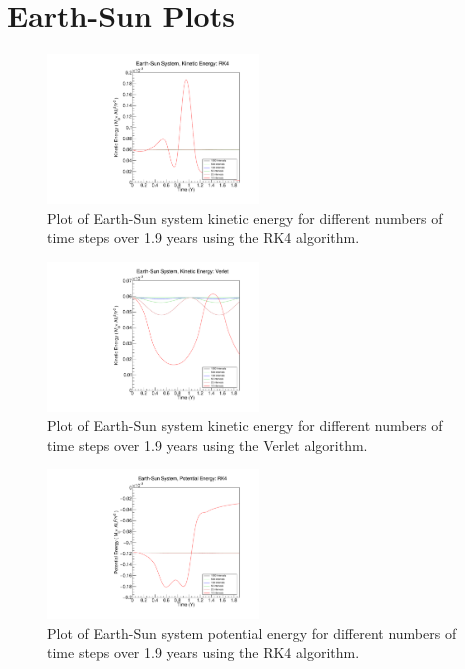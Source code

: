 \documentclass[a4paper,12pt]{report}
\begin{document}
\appendix
{}
\chapter{Earth-Sun Plots}\label{app:esplots}

\begin{figure}[H]
 \centering
   \includegraphics[width=0.5\textwidth]{ESRK4_ke.pdf}
  \caption{Plot of Earth-Sun system kinetic energy for different numbers of time steps over 1.9 years using the RK4 algorithm.}
  \label{fig:ESRK4_ke}
 \end{figure}
 
   \begin{figure}[H]
 \centering
   \includegraphics[width=0.5\textwidth]{ESVerlet_ke.pdf}
  \caption{Plot of Earth-Sun system kinetic energy for different numbers of time steps over 1.9 years using the Verlet algorithm.}
  \label{fig:ESVerlet_ke}
 \end{figure}


\begin{figure}[H]
 \centering
   \includegraphics[width=0.5\textwidth]{ESRK4_pe.pdf}
  \caption{Plot of Earth-Sun system potential energy for different numbers of time steps over 1.9 years using the RK4 algorithm.}
  \label{fig:ESRK4_pe}
 \end{figure}
\end{document}
